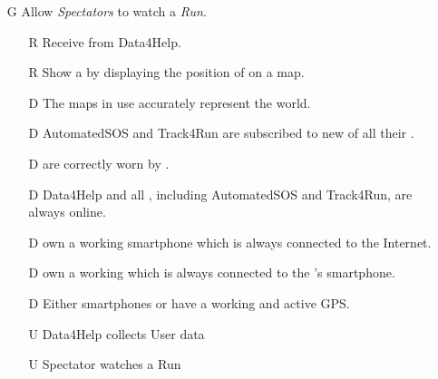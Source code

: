\documentclass[../../../rasd.tex]{subfiles}
\begin{document}
\begin{itemize}
	\item[G\subs{10}]Allow \textit{Spectators} to watch a \textit{Run}.
	\begin{itemize}
		\item[R\subs{40}]Receive  from Data4Help.
		\item[R\subs{48}]Show a  by displaying the position of  on a map.
		\\
		\item[D\subs{3}]The maps in use accurately represent the world.
		\item[D\subs{6}]AutomatedSOS and Track4Run are subscribed to new  of all their .
		\item[D\subs{8}] are correctly worn by .
		\item[D\subs{9}]Data4Help and all , including AutomatedSOS and Track4Run, are always online.
		\item[D\subs{10}] own a working smartphone which is always connected to the Internet.
		\item[D\subs{11}] own a working  which is always connected to the 's smartphone.
		\item[D\subs{12}]Either smartphones or  have a working and active GPS.
		\\
		\item[U\subs{5}]Data4Help collects User data
		\item[U\subs{16}]Spectator watches a Run
	\end{itemize}
\end{itemize}
\end{document}
